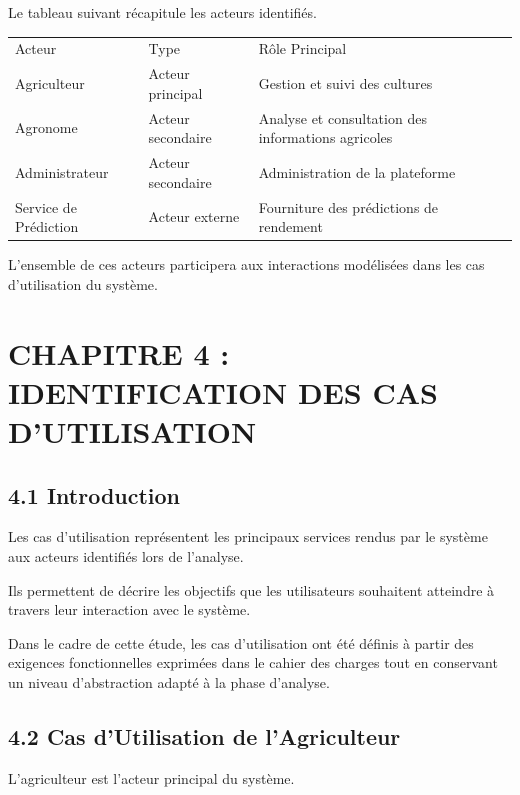 \documentclass[
]{article}
\begin{document}
Le tableau suivant récapitule les acteurs identifiés.

\begin{longtable}[]{@{}lll@{}}
\toprule
\endhead
Acteur & Type & Rôle Principal \\
Agriculteur & Acteur principal & Gestion et suivi des cultures \\
Agronome & Acteur secondaire & Analyse et consultation des informations
agricoles \\
Administrateur & Acteur secondaire & Administration de la plateforme \\
Service de Prédiction & Acteur externe & Fourniture des prédictions de
rendement \\
\bottomrule
\end{longtable}

L'ensemble de ces acteurs participera aux interactions modélisées dans
les cas d'utilisation du système.

\hypertarget{chapitre-4-identification-des-cas-dutilisation}{%
\section{CHAPITRE 4 : IDENTIFICATION DES CAS
D'UTILISATION}\label{chapitre-4-identification-des-cas-dutilisation}}

\hypertarget{introduction-1}{%
\subsection{4.1 Introduction}\label{introduction-1}}

Les cas d'utilisation représentent les principaux services rendus par le
système aux acteurs identifiés lors de l'analyse.

Ils permettent de décrire les objectifs que les utilisateurs souhaitent
atteindre à travers leur interaction avec le système.

Dans le cadre de cette étude, les cas d'utilisation ont été définis à
partir des exigences fonctionnelles exprimées dans le cahier des charges
tout en conservant un niveau d'abstraction adapté à la phase d'analyse.

\hypertarget{cas-dutilisation-de-lagriculteur}{%
\subsection{4.2 Cas d'Utilisation de
l'Agriculteur}\label{cas-dutilisation-de-lagriculteur}}

L'agriculteur est l'acteur principal du système.
\end{document}
